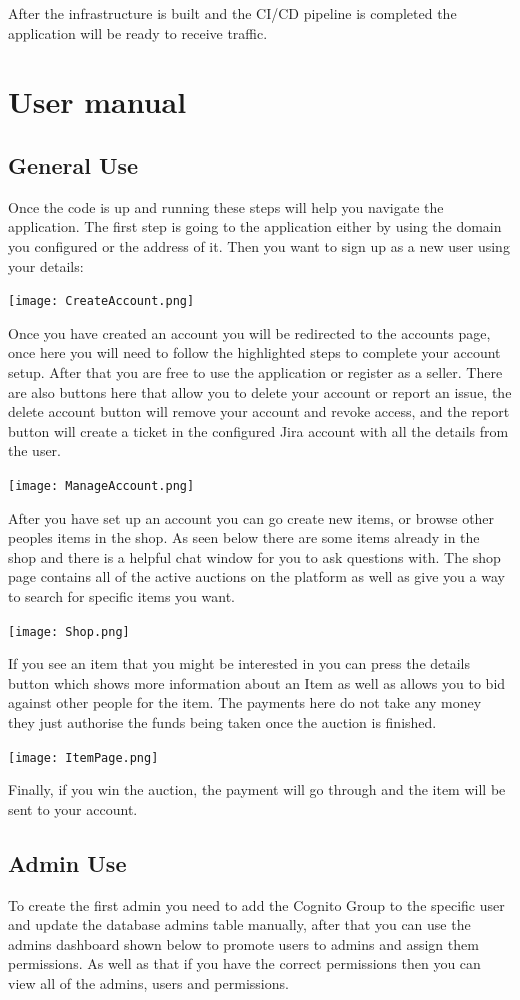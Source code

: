 \documentclass[]{project_report}
\begin{document}
After the infrastructure is built and the CI/CD pipeline is completed the application will be ready to receive traffic.

\section{User manual}
\subsection{General Use}
Once the code is up and running these steps will help you navigate the application. The first step is going to the application either by using the domain you configured or the address of it. Then you want to sign up as a new user using your details:

\texttt{[image: CreateAccount.png]}

Once you have created an account you will be redirected to the accounts page, once here you will need to follow the highlighted steps to complete your account setup. After that you are free to use the application or register as a seller. There are also buttons here that allow you to delete your account or report an issue, the delete account button will remove your account and revoke access, and the report button will create a ticket in the configured Jira account with all the details from the user.

\texttt{[image: ManageAccount.png]}

After you have set up an account you can go create new items, or browse other peoples items in the shop. As seen below there are some items already in the shop and there is a helpful chat window for you to ask questions with. The shop page contains all of the active auctions on the platform as well as give you a way to search for specific items you want.

\texttt{[image: Shop.png]}

If you see an item that you might be interested in you can press the details button which shows more information about an Item as well as allows you to bid against other people for the item. The payments here do not take any money they just authorise the funds being taken once the auction is finished.

\texttt{[image: ItemPage.png]}

Finally, if you win the auction, the payment will go through and the item will be sent to your account. 


\subsection{Admin Use}
To create the first admin you need to add the Cognito Group to the specific user and update the database admins table manually, after that you can use the admins dashboard shown below to promote users to admins and assign them permissions. As well as that if you have the correct permissions then you can view all of the admins, users and permissions.
\end{document}
